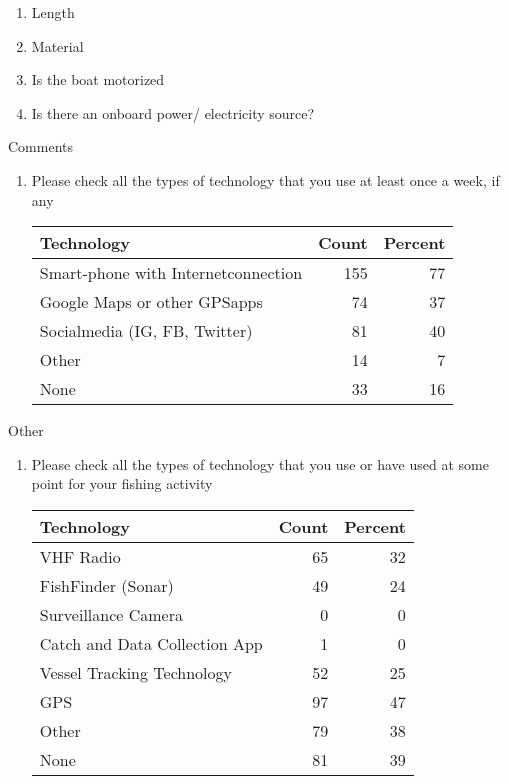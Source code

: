 \documentclass[]{article}
\providecommand{\tightlist}{%
  \setlength{\itemsep}{0pt}\setlength{\parskip}{0pt}}
\begin{document}
\begin{enumerate}
\def\labelenumi{\alph{enumi}.}
\item
  Length
\item
  Material
\item
  Is the boat motorized
\item
  Is there an onboard power/ electricity source?
\end{enumerate}

Comments

\begin{enumerate}
\def\labelenumi{\arabic{enumi}.}
\setcounter{enumi}{6}
\tightlist
\item
  Please check all the types of technology that you use at least once a
  week, if any

  \begin{table}[H]
  \centering
  \begin{tabular}{l|r|r}
  \hline
  Technology & Count & Percent\\
  \hline
  Smart-phone with Internetconnection & 155 & 77\\
  \hline
  Google Maps or other GPSapps & 74 & 37\\
  \hline
  Socialmedia (IG, FB, Twitter) & 81 & 40\\
  \hline
  Other & 14 & 7\\
  \hline
  None & 33 & 16\\
  \hline
  \end{tabular}
  \end{table}
\end{enumerate}

Other

\begin{enumerate}
\def\labelenumi{\arabic{enumi}.}
\setcounter{enumi}{7}
\tightlist
\item
  Please check all the types of technology that you use or have used at
  some point for your fishing activity

  \begin{table}[H]
  \centering
  \begin{tabular}{l|r|r}
  \hline
  Technology & Count & Percent\\
  \hline
  VHF Radio & 65 & 32\\
  \hline
  FishFinder (Sonar) & 49 & 24\\
  \hline
  Surveillance Camera & 0 & 0\\
  \hline
  Catch and Data Collection App & 1 & 0\\
  \hline
  Vessel Tracking Technology & 52 & 25\\
  \hline
  GPS & 97 & 47\\
  \hline
  Other & 79 & 38\\
  \hline
  None & 81 & 39\\
  \hline
  \end{tabular}
  \end{table}
\end{enumerate}
\end{document}
